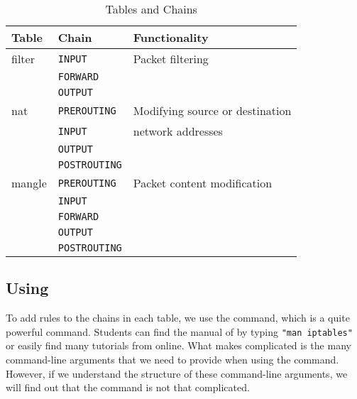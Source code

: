 \begin{table}[htb]
        \centering
        \caption{\iptables Tables and Chains}
        \label{firewall:table:iptables}
        \centering

        \begin{tabular}{|l|l|l|}
                \hline
                \bfseries Table & \bfseries Chain & \bfseries Functionality \\
                \hline\hline
                filter          &    \texttt{INPUT}      & Packet filtering \\
                                &    \texttt{FORWARD}    & \\
                                &    \texttt{OUTPUT}      & \\
                \hline
                nat             &   \texttt{PREROUTING}    & Modifying source or destination \\
                                &   \texttt{INPUT}      & network addresses \\
                                &   \texttt{OUTPUT}      & \\
                                &   \texttt{POSTROUTING}   & \\
                \hline
                mangle          &   \texttt{PREROUTING}    & Packet content modification \\
                                &   \texttt{INPUT}      & \\
                                &   \texttt{FORWARD}     & \\
                                &   \texttt{OUTPUT}      & \\
                                &   \texttt{POSTROUTING}   & \\
                \hline
        \end{tabular}
\end{table}


\subsection{Using \iptables}


To add rules to the chains in each table, we use the \iptables command,
which is a quite powerful command. 
Students can find the manual of \iptables by typing \texttt{"man iptables"} 
or easily find many tutorials from online. 
What makes \iptables complicated is the many command-line arguments 
that we need to provide when
using the command. However, 
if we understand the structure of these command-line arguments, 
we will find out that the command is not that complicated. 


